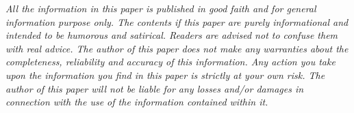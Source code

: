 \documentclass{article}
\begin{document}
\emph{All the information in this paper is published in good faith and for general information purpose only. The contents if this paper are purely informational and intended to be humorous and satirical. Readers are advised not to confuse them with real advice. The author of this paper does not make any warranties about the completeness, reliability and accuracy of this information. Any action you take upon the information you find in this paper is strictly at your own risk. The author of this paper will not be liable for any losses and/or damages in connection with the use of the information contained within it.}
\end{document}
